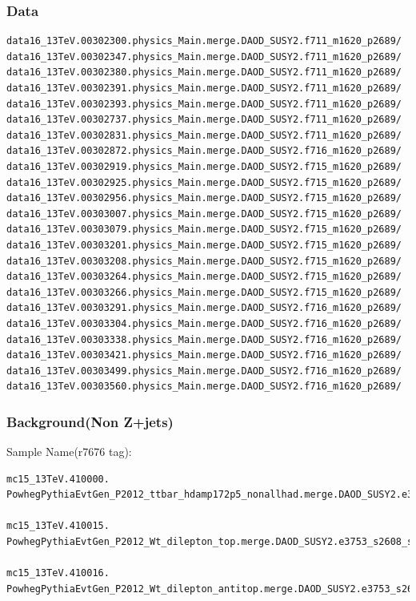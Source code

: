 \documentclass[mathserif,serif]{beamer}
\begin{document}
\begin{frame}[fragile]
\frametitle{Data}
\tiny
\begin{verbatim}
data16_13TeV.00302300.physics_Main.merge.DAOD_SUSY2.f711_m1620_p2689/
data16_13TeV.00302347.physics_Main.merge.DAOD_SUSY2.f711_m1620_p2689/
data16_13TeV.00302380.physics_Main.merge.DAOD_SUSY2.f711_m1620_p2689/
data16_13TeV.00302391.physics_Main.merge.DAOD_SUSY2.f711_m1620_p2689/
data16_13TeV.00302393.physics_Main.merge.DAOD_SUSY2.f711_m1620_p2689/
data16_13TeV.00302737.physics_Main.merge.DAOD_SUSY2.f711_m1620_p2689/
data16_13TeV.00302831.physics_Main.merge.DAOD_SUSY2.f711_m1620_p2689/
data16_13TeV.00302872.physics_Main.merge.DAOD_SUSY2.f716_m1620_p2689/
data16_13TeV.00302919.physics_Main.merge.DAOD_SUSY2.f715_m1620_p2689/
data16_13TeV.00302925.physics_Main.merge.DAOD_SUSY2.f715_m1620_p2689/
data16_13TeV.00302956.physics_Main.merge.DAOD_SUSY2.f715_m1620_p2689/
data16_13TeV.00303007.physics_Main.merge.DAOD_SUSY2.f715_m1620_p2689/
data16_13TeV.00303079.physics_Main.merge.DAOD_SUSY2.f715_m1620_p2689/
data16_13TeV.00303201.physics_Main.merge.DAOD_SUSY2.f715_m1620_p2689/
data16_13TeV.00303208.physics_Main.merge.DAOD_SUSY2.f715_m1620_p2689/
data16_13TeV.00303264.physics_Main.merge.DAOD_SUSY2.f715_m1620_p2689/
data16_13TeV.00303266.physics_Main.merge.DAOD_SUSY2.f715_m1620_p2689/
data16_13TeV.00303291.physics_Main.merge.DAOD_SUSY2.f716_m1620_p2689/
data16_13TeV.00303304.physics_Main.merge.DAOD_SUSY2.f716_m1620_p2689/
data16_13TeV.00303338.physics_Main.merge.DAOD_SUSY2.f716_m1620_p2689/
data16_13TeV.00303421.physics_Main.merge.DAOD_SUSY2.f716_m1620_p2689/
data16_13TeV.00303499.physics_Main.merge.DAOD_SUSY2.f716_m1620_p2689/
data16_13TeV.00303560.physics_Main.merge.DAOD_SUSY2.f716_m1620_p2689/
\end{verbatim}
\end{frame}

\begin{frame}[fragile]
\frametitle{Background(Non Z+jets)}
\small
Sample Name(r7676 tag):
\tiny
\begin{verbatim}
mc15_13TeV.410000.
PowhegPythiaEvtGen_P2012_ttbar_hdamp172p5_nonallhad.merge.DAOD_SUSY2.e3698_s2608_s2183_r7725_r7676_p2666/

mc15_13TeV.410015.
PowhegPythiaEvtGen_P2012_Wt_dilepton_top.merge.DAOD_SUSY2.e3753_s2608_s2183_r7725_r7676_p2666/

mc15_13TeV.410016.
PowhegPythiaEvtGen_P2012_Wt_dilepton_antitop.merge.DAOD_SUSY2.e3753_s2608_s2183_r7725_r7676_p2666/
\end{verbatim}
\end{frame}
\end{document}

